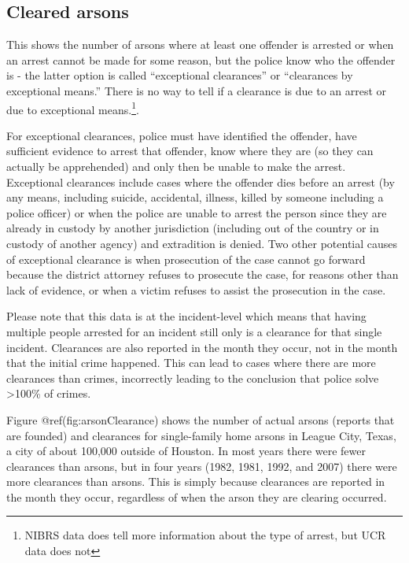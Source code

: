 \documentclass[
  12pt,
  openany]{book}
\begin{document}
\hypertarget{cleared-arsons}{%
\subsection{Cleared arsons}\label{cleared-arsons}}

This shows the number of arsons where at least one offender is arrested or when an arrest cannot be made for some reason, but the police know who the offender is - the latter option is called ``exceptional clearances'' or ``clearances by exceptional means.'' There is no way to tell if a clearance is due to an arrest or due to exceptional means.\footnote{NIBRS data does tell more information about the type of arrest, but UCR data does not}.

For exceptional clearances, police must have identified the offender, have sufficient evidence to arrest that offender, know where they are (so they can actually be apprehended) and only then be unable to make the arrest. Exceptional clearances include cases where the offender dies before an arrest (by any means, including suicide, accidental, illness, killed by someone including a police officer) or when the police are unable to arrest the person since they are already in custody by another jurisdiction (including out of the country or in custody of another agency) and extradition is denied. Two other potential causes of exceptional clearance is when prosecution of the case cannot go forward because the district attorney refuses to prosecute the case, for reasons other than lack of evidence, or when a victim refuses to assist the prosecution in the case.

Please note that this data is at the incident-level which means that having multiple people arrested for an incident still only is a clearance for that single incident. Clearances are also reported in the month they occur, not in the month that the initial crime happened. This can lead to cases where there are more clearances than crimes, incorrectly leading to the conclusion that police solve \textgreater100\% of crimes.

Figure @ref(fig:arsonClearance) shows the number of actual arsons (reports that are founded) and clearances for single-family home arsons in League City, Texas, a city of about 100,000 outside of Houston. In most years there were fewer clearances than arsons, but in four years (1982, 1981, 1992, and 2007) there were more clearances than arsons. This is simply because clearances are reported in the month they occur, regardless of when the arson they are clearing occurred.
\end{document}
